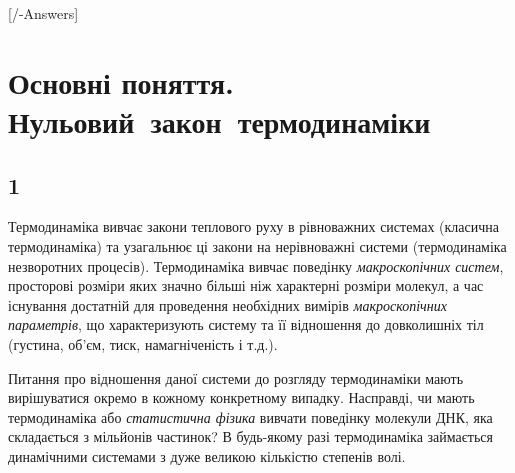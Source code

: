 
[\currfilebase/\currfilebase-Answers]
\chapter{Основні поняття. \mbox{Нульовий закон термодинаміки}}\label{\currfilebase}
\makeatletter
{}
\makeatother







\section{1}


Термодинаміка вивчає закони теплового руху в рівноважних системах (класична термодинаміка) та узагальнює ці закони на нерівноважні системи (термодинаміка незворотних процесів). Термодинаміка вивчає поведінку \emph{макроскопічних систем}, просторові розміри яких значно більші ніж характерні розміри молекул, а час існування достатній для проведення необхідних вимірів \emph{макроскопічних параметрів}, що характеризують систему та її відношення до довколишніх тіл (густина, об'єм, тиск, намагніченість і т.д.).


Питання про відношення даної системи до розгляду термодинаміки мають вирішуватися окремо в кожному конкретному випадку. Насправді, чи мають термодинаміка або \emph{статистична фізика}  вивчати поведінку молекули ДНК, яка складається з мільйонів частинок? В будь-якому разі термодинаміка займається динамічними системами з дуже великою кількістю степенів волі.

